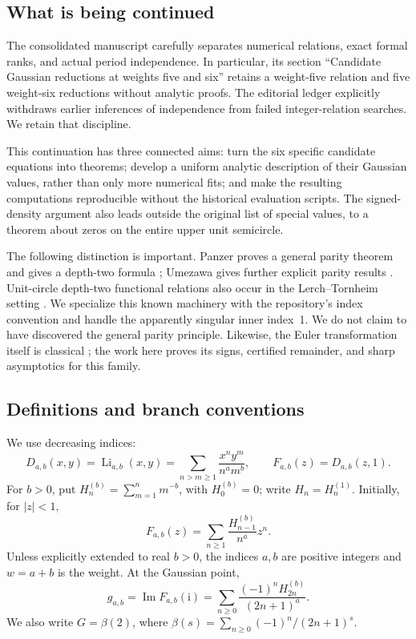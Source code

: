 \documentclass[11pt,a4paper]{article}
\numberwithin{equation}{section}
\theoremstyle{definition}
\theoremstyle{remark}
\newcommand{\Li}{\operatorname{Li}}
\newcommand{\Imag}{\operatorname{Im}}
\newcommand{\ii}{\mathrm{i}}
\begin{document}
\subsection{What is being continued}
The consolidated manuscript \cite{repo} carefully separates numerical relations, exact formal ranks, and actual period independence. In particular, its section ``Candidate Gaussian reductions at weights five and six'' retains a weight-five relation and five weight-six reductions without analytic proofs. The editorial ledger explicitly withdraws earlier inferences of independence from failed integer-relation searches. We retain that discipline.

This continuation has three connected aims: turn the six specific candidate equations into theorems; develop a uniform analytic description of their Gaussian values, rather than only more numerical fits; and make the resulting computations reproducible without the historical evaluation scripts. The signed-density argument also leads outside the original list of special values, to a theorem about zeros on the entire upper unit semicircle.

The following distinction is important. Panzer proves a general parity theorem and gives a depth-two formula \cite{Panzer}; Umezawa gives further explicit parity results \cite{Umezawa}. Unit-circle depth-two functional relations also occur in the Lerch--Tornheim setting \cite{Nakamura}. We specialize this known machinery with the repository's index convention and handle the apparently singular inner index~1. We do not claim to have discovered the general parity principle. Likewise, the Euler transformation itself is classical \cite{DLMF39}; the work here proves its signs, certified remainder, and sharp asymptotics for this family.

\subsection{Definitions and branch conventions}
We use decreasing indices:
\begin{equation}\label{eq:double-def}
 D_{a,b}(x,y)=\Li_{a,b}(x,y)
 =\sum_{n>m\ge1}\frac{x^ny^m}{n^am^b},\qquad
 F_{a,b}(z)=D_{a,b}(z,1).
\end{equation}
For $b>0$, put $H_n^{(b)}=\sum_{m=1}^n m^{-b}$, with $H_0^{(b)}=0$; write $H_n=H_n^{(1)}$. Initially, for $|z|<1$,
\begin{equation}\label{eq:F-series}
 F_{a,b}(z)=\sum_{n\ge1}\frac{H_{n-1}^{(b)}}{n^a}z^n.
\end{equation}
Unless explicitly extended to real $b>0$, the indices $a,b$ are positive integers and $w=a+b$ is the weight. At the Gaussian point,
\begin{equation}\label{eq:g-def}
 g_{a,b}=\Imag F_{a,b}(\ii)
 =\sum_{n\ge0}\frac{(-1)^nH_{2n}^{(b)}}{(2n+1)^a}.
\end{equation}
We also write $G=\beta(2)$, where $\beta(s)=\sum_{n\ge0}(-1)^n/(2n+1)^s$.
\end{document}
